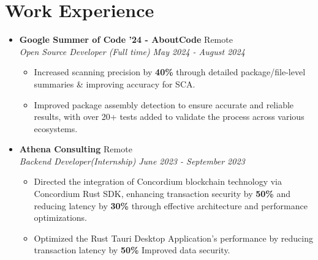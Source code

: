 \documentclass[legalpaper,10.5pt]{article}
\begin{document}
\section{Work Experience}
\begin{itemize}[leftmargin=*]

\item \textbf{Google Summer of Code '24 - AboutCode}  \hfill {Remote} \\
\textit{Open Source Developer (Full time)}  \hfill \textit{May 2024 - August 2024}
\begin{itemize}[label=$\diamond$]
    \item \small Increased scanning precision by \textbf{40\%} through detailed package/file-level summaries \& improving accuracy for SCA.
    \item Improved package assembly detection to ensure accurate and reliable results, with over 20+ tests added to validate the process across various ecosystems.

\end{itemize}

\item \textbf {Athena Consulting} \hfill Remote \\[3.75pt]
\textit{Backend Developer(Internship)} \hfill \textit{June 2023 - September 2023}
\begin{itemize}[label=$\diamond$]
    \item \small Directed the integration of Concordium blockchain technology via Concordium Rust SDK, enhancing transaction security by \textbf{50\%} and reducing latency by \textbf{30\%} through effective architecture and performance optimizations.
    \item \small Optimized the Rust Tauri Desktop Application's performance by reducing transaction latency by \textbf{50\%} Improved data security.
\end{itemize}
\end{itemize}
\end{document}
